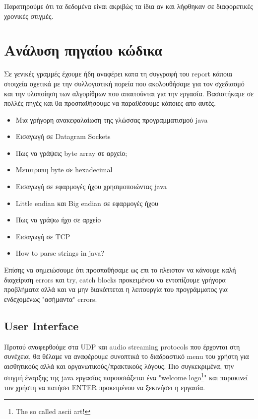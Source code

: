 \documentclass[hidelinks, 12pt, a4paper]{article}
\begin{document}
Παρατηρούμε ότι τα δεδομένα είναι ακριβώς τα ίδια αν και λήφθηκαν σε διαφορετικές χρονικές στιγμές.

\section{Ανάλυση πηγαίου κώδικα}

Σε γενικές γραμμές έχουμε ήδη αναφέρει κατα τη συγγραφή του report κάποια στοιχεία σχετικά με την συλλογιστική πορεία που ακολουθήσαμε για τον σχεδιασμό και την υλοποίηση των αλγορίθμων που απαιτούνται για την εργασία. Βασιστήκαμε σε πολλές πηγές και θα προσπαθήσουμε να παραθέσουμε κάποιες απο αυτές.

\begin{itemize}
    \item Μια γρήγορη ανακεφαλαίωση της γλώσσας προγραμματισμού java \cite{derek}
    \item Εισαγωγή σε Datagram Sockets \cite{romaniancoder, oracle}
    \item Πως να γράψεις byte array σε αρχείο; \cite{javafile}
    \item Μετατροπη byte σε hexadecimal \cite{programizhex}
    \item Εισαγωγή σε εφαρμογές ήχου χρησιμοποιώντας java \cite{oraclesound}
    \item Little endian και Big endian σε εφαρμογές ήχου \cite{stackendian}
    \item Πως να γράψω ήχο σε αρχείο \cite{stackaudiofile}
    \item Εισαγωγή σε TCP \cite{tutorpoints, mediumtcp, codejava}
    \item How to parse strings in java? \cite{stackparsestring}
\end{itemize}


Επίσης να σημειώσουμε ότι προσπαθήσαμε ως επι το πλειστον να κάνουμε καλή διαχείριση errors και try, catch blocks προκειμένου να εντοπίζουμε γρήγορα προβλήματα αλλά και να μην διακόπτεται η λειτουργία του προγράμματος για ενδεχομένως "ασήμαντα" errors.

\subsection{User Interface}

Προτού αναφερθούμε στα UDP και audio streaming protocols που έρχονται στη συνέχεια, θα θέλαμε να αναφέρουμε συνοπτικά το διαδραστικό menu του χρήστη για αισθητικούς αλλά και οργανωτικούς/πρακτικούς λόγους. Πιο συγκεκριμένα, την στιγμή έναρξης της java εργασίας παρουσιάζεται ένα "welcome logo\footnote{The so called ascii art!}" και παρακινεί τον χρήστη να πατήσει ENTER προκειμένου να ξεκινήσει η εργασία.
\end{document}
